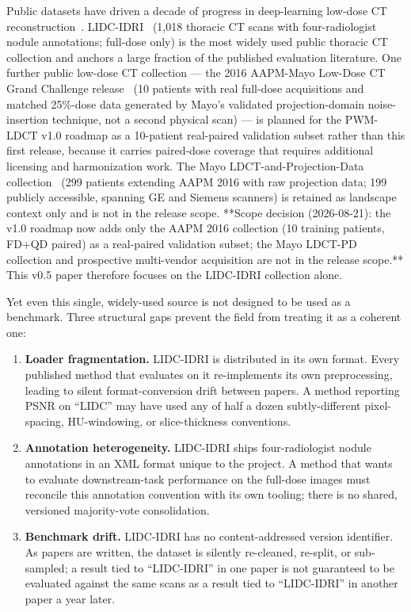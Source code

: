 \documentclass[twoside,11pt]{article}
\begin{document}
Public datasets have driven a decade of progress in deep-learning low-dose CT reconstruction~\citep{chen2017redcnn,wang2020deeplearningreview}. LIDC-IDRI~\citep{lidc_idri} (1{,}018 thoracic CT scans with four-radiologist nodule annotations; full-dose only) is the most widely used public thoracic CT collection and anchors a large fraction of the published evaluation literature. One further public low-dose CT collection --- the 2016 AAPM-Mayo Low-Dose CT Grand Challenge release~\citep{aapm2016challenge} (10 patients with real full-dose acquisitions and matched 25\%-dose data generated by Mayo's validated projection-domain noise-insertion technique, not a second physical scan) --- is planned for the PWM-LDCT v1.0 roadmap as a 10-patient real-paired validation subset rather than this first release, because it carries paired-dose coverage that requires additional licensing and harmonization work. The Mayo LDCT-and-Projection-Data collection~\citep{mccollough2020mayo} (299 patients extending AAPM 2016 with raw projection data; 199 publicly accessible, spanning GE and Siemens scanners) is retained as landscape context only and is not in the release scope. **Scope decision (2026-08-21): the v1.0 roadmap now adds only the AAPM 2016 collection (10 training patients, FD+QD paired) as a real-paired validation subset; the Mayo LDCT-PD collection and prospective multi-vendor acquisition are not in the release scope.** This v0.5 paper therefore focuses on the LIDC-IDRI collection alone.

Yet even this single, widely-used source is not designed to be used as a benchmark. Three structural gaps prevent the field from treating it as a coherent one:

\begin{enumerate}
    \item \textbf{Loader fragmentation.} LIDC-IDRI is distributed in its own format. Every published method that evaluates on it re-implements its own preprocessing, leading to silent format-conversion drift between papers. A method reporting PSNR on ``LIDC'' may have used any of half a dozen subtly-different pixel-spacing, HU-windowing, or slice-thickness conventions.
    \item \textbf{Annotation heterogeneity.} LIDC-IDRI ships four-radiologist nodule annotations in an XML format unique to the project. A method that wants to evaluate downstream-task performance on the full-dose images must reconcile this annotation convention with its own tooling; there is no shared, versioned majority-vote consolidation.
    \item \textbf{Benchmark drift.} LIDC-IDRI has no content-addressed version identifier. As papers are written, the dataset is silently re-cleaned, re-split, or sub-sampled; a result tied to ``LIDC-IDRI'' in one paper is not guaranteed to be evaluated against the same scans as a result tied to ``LIDC-IDRI'' in another paper a year later.
\end{enumerate}
\end{document}
